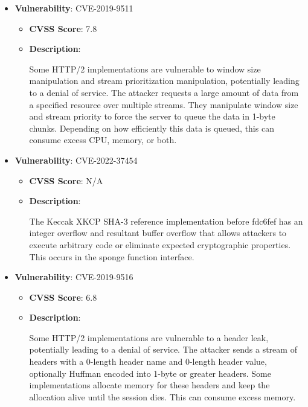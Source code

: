 \documentclass{article}
\begin{document}
\begin{itemize}
        \item \textbf{Vulnerability}: CVE-2019-9511
        \begin{itemize}
            \item \textbf{CVSS Score}:  7.8 
            \item \textbf{Description}:
            \parbox[t]{0.9\linewidth}{
                \ttfamily Some HTTP/2 implementations are vulnerable to window size manipulation and stream prioritization manipulation, potentially leading to a denial of service. The attacker requests a large amount of data from a specified resource over multiple streams. They manipulate window size and stream priority to force the server to queue the data in 1-byte chunks. Depending on how efficiently this data is queued, this can consume excess CPU, memory, or both.
            }
        \end{itemize}
    
        \item \textbf{Vulnerability}: CVE-2022-37454
        \begin{itemize}
            \item \textbf{CVSS Score}:  N/A 
            \item \textbf{Description}:
            \parbox[t]{0.9\linewidth}{
                \ttfamily The Keccak XKCP SHA-3 reference implementation before fdc6fef has an integer overflow and resultant buffer overflow that allows attackers to execute arbitrary code or eliminate expected cryptographic properties. This occurs in the sponge function interface.
            }
        \end{itemize}
    
        \item \textbf{Vulnerability}: CVE-2019-9516
        \begin{itemize}
            \item \textbf{CVSS Score}:  6.8 
            \item \textbf{Description}:
            \parbox[t]{0.9\linewidth}{
                \ttfamily Some HTTP/2 implementations are vulnerable to a header leak, potentially leading to a denial of service. The attacker sends a stream of headers with a 0-length header name and 0-length header value, optionally Huffman encoded into 1-byte or greater headers. Some implementations allocate memory for these headers and keep the allocation alive until the session dies. This can consume excess memory.
            }
        \end{itemize}
    

\end{itemize}
\end{document}
